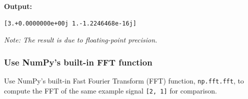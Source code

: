 \begin{Shaded}
\begin{Highlighting}[]

\OperatorTok{=} 
\OperatorTok{=}\OperatorTok{=}\NormalTok{)}
     
         
\OperatorTok{+=}\OperatorTok{*}\OperatorTok{{-}} \OperatorTok{*}\OperatorTok{*}\OperatorTok{*}\OperatorTok{/}

\OperatorTok{=}\NormalTok{ np.array([}\NormalTok{, }\NormalTok{])}

\OperatorTok{=}

\end{Highlighting}
\end{Shaded}

\textbf{Output:}

\begin{verbatim}
[3.+0.0000000e+00j 1.-1.2246468e-16j]
\end{verbatim}

\emph{Note: The result is due to floating-point precision.}

\hypertarget{use-numpys-built-in-fft-function}{%
\subsubsection{Use NumPy's built-in FFT
function}\label{use-numpys-built-in-fft-function}}

Use NumPy's built-in Fast Fourier Transform (FFT) function,
\texttt{np.fft.fft}, to compute the FFT of the same example signal
\texttt{{[}2,\ 1{]}} for comparison.

\begin{Shaded}
\begin{Highlighting}[]

\OperatorTok{=}\NormalTok{ np.array([}\NormalTok{, }\NormalTok{])}

\OperatorTok{=}
\end{Highlighting}
\end{Shaded}

